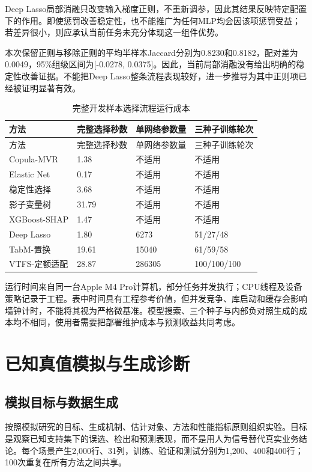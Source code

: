 \documentclass{sufethesismas}
\begin{document}
Deep Lasso局部消融只改变输入梯度正则，不重新调参，因此其结果反映特定配置下的作用。即使惩罚改善稳定性，也不能推广为任何MLP均会因该项惩罚受益；若差异很小，则应承认当前任务未充分体现这一组件优势。

本次保留正则与移除正则的平均半样本Jaccard分别为0.8230和0.8182，配对差为0.0049，95\%组级区间为{[}-0.0278, 0.0375{]}。因此，当前局部消融没有给出明确的稳定性改善证据。不能把Deep Lasso整条流程表现较好，进一步推导为其中正则项已经被证明显著有效。

{
\footnotesize
\begin{longtable}[]{@{}llll@{}}
\caption{完整开发样本选择流程运行成本}\tabularnewline
\toprule\noalign{}
方法 & 完整选择秒数 & 单网络参数量 & 三种子训练轮次 \\
\midrule\noalign{}
\endfirsthead
\toprule\noalign{}
方法 & 完整选择秒数 & 单网络参数量 & 三种子训练轮次 \\
\midrule\noalign{}
\endhead
\bottomrule\noalign{}
\endlastfoot
Copula-MVR & 1.38 & 不适用 & 不适用 \\
Elastic Net & 0.17 & 不适用 & 不适用 \\
稳定性选择 & 3.68 & 不适用 & 不适用 \\
影子变量树 & 31.79 & 不适用 & 不适用 \\
XGBoost-SHAP & 1.47 & 不适用 & 不适用 \\
Deep Lasso & 1.80 & 6273 & 51/27/48 \\
TabM-置换 & 19.61 & 15040 & 61/59/58 \\
VTFS-定额适配 & 28.87 & 286305 & 100/100/100 \\
\end{longtable}
}

运行时间来自同一台Apple M4 Pro计算机，部分任务并发执行；CPU线程及设备策略记录于工程。表中时间具有工程参考价值，但并发竞争、库启动和缓存会影响墙钟计时，不能将其视为严格微基准。模型搜索、三个种子与内部负对照生成的成本均不相同，使用者需要把部署维护成本与预测收益共同考虑。

\chapter{已知真值模拟与生成诊断}

\section{模拟目标与数据生成}

按照模拟研究的目标、生成机制、估计对象、方法和性能指标原则组织实验\cite{morris2019}。目标是观察已知支持集下的误选、检出和预测表现，而不是用人为信号替代真实业务结论。每个场景产生2,000行、31列，训练、验证和测试分别为1,200、400和400行；100次重复在所有方法之间共享。
\end{document}
